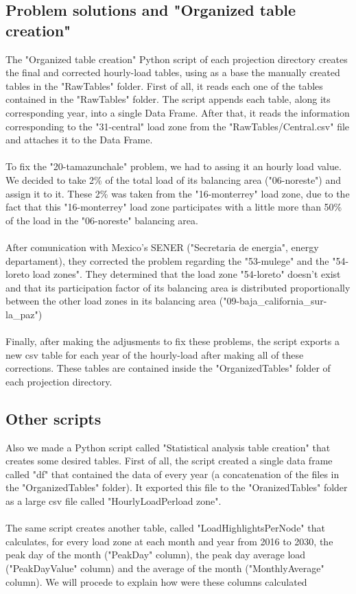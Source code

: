 \documentclass{article}
\begin{document}
\subsection{Problem solutions and "Organized table creation"}
The "Organized table creation" Python script of each projection directory creates the final and corrected hourly-load tables, using as a base the manually created tables in the "RawTables" folder. First of all, it reads each one of the tables contained in the "RawTables" folder. The script appends each table, along its corresponding year, into a single Data Frame. After that, it reads the information corresponding to the "31-central" load zone from the "RawTables/Central.csv" file and attaches it to the Data Frame.
\\
\\ To fix the "20-tamazunchale" problem, we had to assing it an hourly load value. We decided to take 2\% of the total load of its balancing area ("06-noreste") and assign it to it. These 2\% was taken from the "16-monterrey" load zone, due to the fact that this "16-monterrey" load zone participates with a little more than 50\% of the load in the "06-noreste" balancing area. 
\\
\\After comunication with Mexico's SENER ("Secretaria de energia", energy departament), they corrected the problem regarding the "53-mulege" and the "54-loreto load zones". They determined that the load zone "54-loreto" doesn't exist and that its participation factor of its balancing area is distributed proportionally between the other load zones in its balancing area ("09-baja\_california\_sur-la\_paz")
\\
\\Finally, after making the adjusments to fix these problems, the script exports a new csv table for each year of the hourly-load after making all of these corrections. These tables are contained inside the "OrganizedTables" folder of each projection directory.
\subsection{Other scripts}
Also we made a Python script called "Statistical analysis table creation" that creates some desired tables. First of all, the script created a single data frame called "df" that contained the data of every year (a concatenation of the files in the "OrganizedTables" folder). It exported this file to the "OranizedTables" folder as a large csv file called "HourlyLoadPerload zone". 
\\
\\The same script creates another table, called "LoadHighlightsPerNode" that calculates, for every load zone at each month and year from 2016 to 2030, the peak day of the month ("PeakDay" column), the peak day average load ("PeakDayValue" column) and the average of the month ("MonthlyAverage" column). We will procede to explain how were these columns calculated
\end{document}
